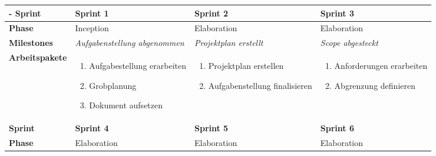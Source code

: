 \begin{landscape}
\begin{longtable}{l p{5.5cm} p{5.5cm} p{5.5cm}}-
        \toprule
        \textbf{Sprint}
                                & \textbf{Sprint 1}
                                & \textbf{Sprint 2}
                                & \textbf{Sprint 3} \\

        \midrule
        \textbf{Phase}
                                & Inception
                                & Elaboration
                                & Elaboration \\

        \textbf{Milestones}
                                & \textit{Aufgabenstellung abgenommen}
                                & \textit{Projektplan erstellt}
                                & \textit{Scope abgesteckt}  \\

        \textbf{Arbeitspakete}
                                & \begin{enumerate}[noitemsep]
                                    \item Aufgabestellung erarbeiten
                                    \item Grobplanung
                                    \item Dokument aufsetzen
                                \end{enumerate}
                                & \begin{enumerate}[noitemsep]
                                    \item Projektplan erstellen
                                    \item Aufgabenstellung finalisieren
                                \end{enumerate}
                                & \begin{enumerate}[noitemsep]
                                    \item Anforderungen erarbeiten
                                    \item Abgrenzung definieren
                                \end{enumerate}\\

        \toprule
        \textbf{Sprint}
                                & \textbf{Sprint 4}
                                & \textbf{Sprint 5}
                                & \textbf{Sprint 6} \\
        \midrule
        \textbf{Phase}
                                & Elaboration
                                & Elaboration
                                & Elaboration \\


\end{longtable}
\end{landscape}
